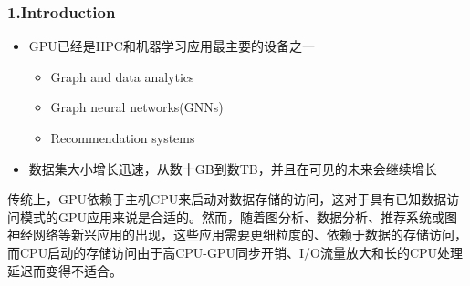\documentclass[10pt]{ctexbeamer}
\begin{document}
\begin{frame}[t]
  \frametitle{1.Introduction}
  \begin{itemize}
    \item GPU已经是HPC和机器学习应用最主要的设备之一
    \begin{itemize}
      \item Graph and data analytics
      \item Graph neural networks(GNNs)
      \item Recommendation systems
    \end{itemize}
  \item 数据集大小增长迅速，从数十GB到数TB，并且在可见的未来会继续增长
  \end{itemize}

  \vfill
  \pause%
  传统上，GPU依赖于主机CPU来启动对数据存储的访问，这对于具有已知数据访问模式的GPU应用来说是合适的。然而，随着图分析、数据分析、推荐系统或图神经网络等新兴应用的出现，这些应用需要更细粒度的、依赖于数据的存储访问，而CPU启动的存储访问由于高CPU-GPU同步开销、I/O流量放大和长的CPU处理延迟而变得不适合。
\end{frame}
\end{document}
